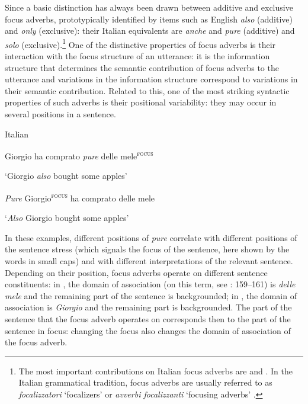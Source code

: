 Since \citet{König1991} a basic distinction has always been drawn between additive and exclusive focus adverbs, prototypically identified by items such as English \textit{also} (additive) and \textit{only} (exclusive): their Italian equivalents are \textit{anche} and \textit{pure} (additive) and \textit{solo} (exclusive).\footnote{The most important contributions on Italian focus adverbs are \citet{Ricca1999} and \citet{Andorno1999,Andorno2000}. In the Italian grammatical tradition, focus adverbs are usually referred to as \textit{focalizzatori} ‘focalizers’ \citep{Ricca1999} or \textit{avverbi focalizzanti} ‘focusing adverbs’ \citep{Andorno1999}.} One of the distinctive properties of focus adverbs is their interaction with the focus structure of an utterance: it is the information structure that determines the semantic contribution of focus adverbs to the utterance and variations in the information structure correspond to variations in their semantic contribution. Related to this, one of the most striking syntactic properties of such adverbs is their positional variability: they may occur in several positions in a sentence.

\ea%
    \label{ex:key:12}

           Italian

\ea \label{ex:key:12a} Giorgio ha comprato \textit{pure} delle mele\textsuperscript{\textsc{focus}}

\glt ‘Giorgio \textit{also} bought some apples’

\ex\label{ex:key:12b} \textit{Pure} Giorgio\textsuperscript{\textsc{focus}} ha comprato delle mele

\glt ‘\textit{Also} Giorgio bought some apples’
\z
\z

In these examples, different positions of \textit{pure} correlate with different positions of the sentence stress (which signals the focus of the sentence, here shown by the words in small caps) and with different interpretations of the relevant sentence. Depending on their position, focus adverbs operate on different sentence constituents: in , the domain of association (on this term, see \citealt{Cesare2017}: 159–161) is \textit{delle mele} and the remaining part of the sentence is backgrounded; in , the domain of association is \textit{Giorgio} and the remaining part is backgrounded. The part of the sentence that the focus adverb operates on corresponds then to the part of the sentence in focus: changing the focus also changes the domain of association of the focus adverb.

